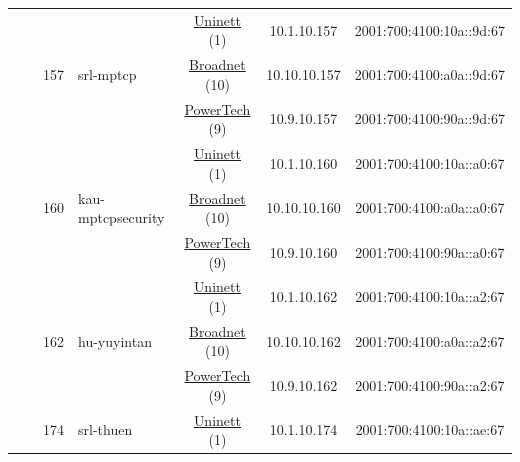 \begin{small}
\begin{center}
\begin{longtable}{|c|c|c|c|c|c|c|c|}
  &  & \multirow{3}{*}{\tiny{157}} & \multicolumn{1}{|l|}{\multirow{3}{*}{\tiny{srl-mptcp}}} & \multicolumn{2}{|c|}{\tiny{\href{https://www.uninett.no}{Uninett} (1)}} & \tiny{10.1.10.157} & \tiny{2001:700:4100:10a::9d:67} \\* \cline{5-5}\cline{6-6}\cline{7-7}\cline{8-8}
  &  &  &  & \multicolumn{2}{|c|}{\tiny{\href{https://www.broadnet.no}{Broadnet} (10)}} & \tiny{10.10.10.157} & \tiny{2001:700:4100:a0a::9d:67} \\* \cline{5-5}\cline{6-6}\cline{7-7}\cline{8-8}
  &  &  &  & \multicolumn{2}{|c|}{\tiny{\href{http://www.powertech.no}{PowerTech} (9)}} & \tiny{10.9.10.157} & \tiny{2001:700:4100:90a::9d:67} \\* \cline{3-3}\cline{4-4}\cline{5-5}\cline{6-6}\cline{7-7}\cline{8-8}
  &  & \multirow{3}{*}{\tiny{160}} & \multicolumn{1}{|l|}{\multirow{3}{*}{\tiny{kau-mptcpsecurity}}} & \multicolumn{2}{|c|}{\tiny{\href{https://www.uninett.no}{Uninett} (1)}} & \tiny{10.1.10.160} & \tiny{2001:700:4100:10a::a0:67} \\* \cline{5-5}\cline{6-6}\cline{7-7}\cline{8-8}
  &  &  &  & \multicolumn{2}{|c|}{\tiny{\href{https://www.broadnet.no}{Broadnet} (10)}} & \tiny{10.10.10.160} & \tiny{2001:700:4100:a0a::a0:67} \\* \cline{5-5}\cline{6-6}\cline{7-7}\cline{8-8}
  &  &  &  & \multicolumn{2}{|c|}{\tiny{\href{http://www.powertech.no}{PowerTech} (9)}} & \tiny{10.9.10.160} & \tiny{2001:700:4100:90a::a0:67} \\* \cline{3-3}\cline{4-4}\cline{5-5}\cline{6-6}\cline{7-7}\cline{8-8}
  &  & \multirow{3}{*}{\tiny{162}} & \multicolumn{1}{|l|}{\multirow{3}{*}{\tiny{hu-yuyintan}}} & \multicolumn{2}{|c|}{\tiny{\href{https://www.uninett.no}{Uninett} (1)}} & \tiny{10.1.10.162} & \tiny{2001:700:4100:10a::a2:67} \\* \cline{5-5}\cline{6-6}\cline{7-7}\cline{8-8}
  &  &  &  & \multicolumn{2}{|c|}{\tiny{\href{https://www.broadnet.no}{Broadnet} (10)}} & \tiny{10.10.10.162} & \tiny{2001:700:4100:a0a::a2:67} \\* \cline{5-5}\cline{6-6}\cline{7-7}\cline{8-8}
  &  &  &  & \multicolumn{2}{|c|}{\tiny{\href{http://www.powertech.no}{PowerTech} (9)}} & \tiny{10.9.10.162} & \tiny{2001:700:4100:90a::a2:67} \\* \cline{3-3}\cline{4-4}\cline{5-5}\cline{6-6}\cline{7-7}\cline{8-8}
  &  & \multirow{3}{*}{\tiny{174}} & \multicolumn{1}{|l|}{\multirow{3}{*}{\tiny{srl-thuen}}} & \multicolumn{2}{|c|}{\tiny{\href{https://www.uninett.no}{Uninett} (1)}} & \tiny{10.1.10.174} & \tiny{2001:700:4100:10a::ae:67} \\* \cline{5-5}\cline{6-6}\cline{7-7}\cline{8-8}

\end{longtable}
\end{center}
\end{small}
